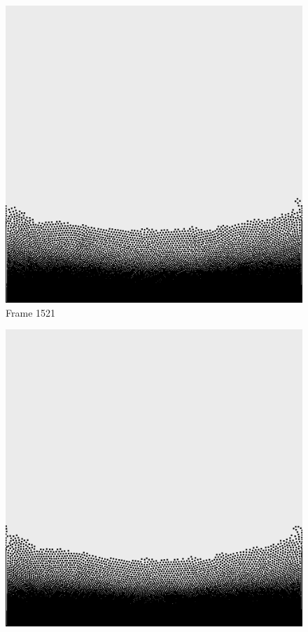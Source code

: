 \documentclass[a4paper, 12pt, oneside]{book}
\begin{document}
\begin{figure}[!ht]
    \addvspace{0.5ex}
        \begin{center}
            \includegraphics[width=\linewidth]{images/test_case_1/1521.png}
            Frame 1521
        \end{center}
    \endminipage
    \hfill
        \begin{center}
            \includegraphics[width=\linewidth]{images/test_case_1/1541.png}

\end{center}
\end{figure}
\end{document}
